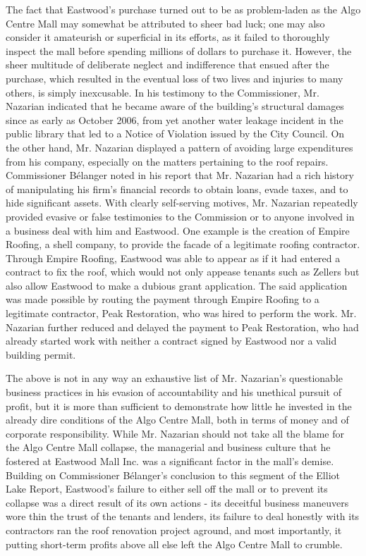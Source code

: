 \documentclass[12pt]{article}
\begin{document}
The fact that Eastwood's purchase turned out to be as problem-laden as the Algo Centre Mall may somewhat be attributed to sheer bad luck; one may also consider it amateurish or superficial in its efforts, as it failed to thoroughly inspect the mall before spending millions of dollars to purchase it. However, the sheer multitude of deliberate neglect and indifference that ensued after the purchase, which resulted in the eventual loss of two lives and injuries to many others, is simply inexcusable. In his testimony to the Commissioner, Mr. Nazarian indicated that he became aware of the building's structural damages since as early as October 2006, from yet another water leakage incident in the public library that led to a Notice of Violation issued by the City Council. On the other hand, Mr. Nazarian displayed a pattern of avoiding large expenditures from his company, especially on the matters pertaining to the roof repairs. Commissioner Bélanger noted in his report that Mr. Nazarian had a rich history of manipulating his firm's financial records to obtain loans, evade taxes, and to hide significant assets. With clearly self-serving motives, Mr. Nazarian repeatedly provided evasive or false testimonies to the Commission or to anyone involved in a business deal with him and Eastwood. One example is the creation of Empire Roofing, a shell company, to provide the facade of a legitimate roofing contractor. Through Empire Roofing, Eastwood was able to appear as if it had entered a contract to fix the roof, which would not only appease tenants such as Zellers but also allow Eastwood to make a dubious grant application. The said application was made possible by routing the payment through Empire Roofing to a legitimate contractor, Peak Restoration, who was hired to perform the work. Mr. Nazarian further reduced and delayed the payment to Peak Restoration, who had already started work with neither a contract signed by Eastwood nor a valid building permit. 

The above is not in any way an exhaustive list of Mr. Nazarian's questionable business practices in his evasion of accountability and his unethical pursuit of profit, but it is more than sufficient to demonstrate how little he invested in the already dire conditions of the Algo Centre Mall, both in terms of money and of corporate responsibility. While Mr. Nazarian should not take all the blame for the Algo Centre Mall collapse, the managerial and business culture that he fostered at Eastwood Mall Inc. was a significant factor in the mall's demise. Building on Commissioner Bélanger's conclusion to this segment of the Elliot Lake Report, Eastwood's failure to either sell off the mall or to prevent its collapse was a direct result of its own actions - its deceitful business maneuvers wore thin the trust of the tenants and lenders, its failure to deal honestly with its contractors ran the roof renovation project aground, and most importantly, it putting short-term profits above all else left the Algo Centre Mall to crumble.
\end{document}
